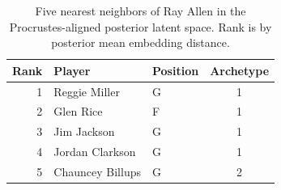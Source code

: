 \begin{table}[htbp]
  \centering\small
  \begin{tabular}{rllc}
    \toprule
    Rank & Player & Position & Archetype \\
    \midrule
    1 & Reggie Miller & G & 1 \\
    2 & Glen Rice & F & 1 \\
    3 & Jim Jackson & G & 1 \\
    4 & Jordan Clarkson & G & 1 \\
    5 & Chauncey Billups & G & 2 \\
    \bottomrule
  \end{tabular}
  \caption{Five nearest neighbors of Ray Allen in the Procrustes-aligned posterior latent space. Rank is by posterior mean embedding distance.}
  \label{tab:Ray_Allen_neighbors}
\end{table}

